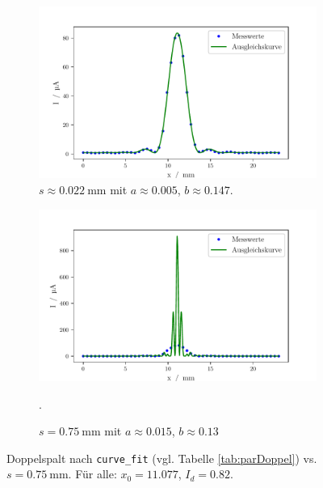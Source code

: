 \begin{figure}
    \centering
    \begin{subfigure}{.5\textwidth}
        \centering
        \includegraphics[width=.7\textwidth]{python/DoppelspaltFit.pdf}
        \caption{$s \approx \SI{0.022}{\milli\meter}$ mit $a \approx 0.005$, $b \approx 0.147$.}
        \label{fig:lsd3ss}
    \end{subfigure}%
    \begin{subfigure}{.5\textwidth}
        \centering
        \includegraphics[width=.7\linewidth]{python/DoppelspaltFits.pdf}
        \caption{$s = \SI{0.75}{\milli\meter}$ mit $a \approx 0.015$, $b \approx 0.13$}.
        \label{fig:lsd3s}
    \end{subfigure}
    \caption{Doppelspalt nach \texttt{curve\_fit} (vgl. Tabelle \ref{tab:parDoppel}) vs. $s = \SI{0.75}{\milli\meter}$. Für alle: $x_0 = 11.077$, $I_d = 0.82$.}
        \label{fig:ggn1}
\end{figure}